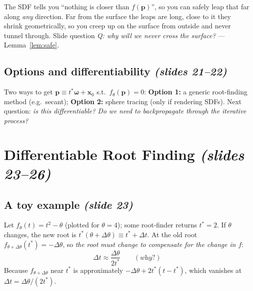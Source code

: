 \documentclass[11pt,a4paper]{article}
\newcommand{\bx}{{\bm{x}}}
\newcommand{\bp}{{\bm{p}}}
\newcommand{\bom}{{\bm{\omega}}}
\begin{document}
\begin{intuition}
The SDF tells you ``nothing is closer than $f(\bp)$'', so you can safely leap that far along \emph{any} direction. Far
from the surface the leaps are long, close to it they shrink geometrically, so you creep up on the surface from outside
and never tunnel through. Slide question \emph{Q: why will we never cross the surface?} --- Lemma~\ref{lem:safe}.
\end{intuition}

\subsection{Options and differentiability \emph{(slides 21--22)}}
Two ways to get $\bp\equiv t^*\bom+\bx_0$ s.t.\ $f_\theta(\bp)=0$: \textbf{Option 1:} a generic root-finding method
(e.g.\ secant); \textbf{Option 2:} sphere tracing (only if rendering SDFs). Next question: \emph{is this differentiable?}
\emph{Do we need to backpropagate through the iterative process?}

\section{Differentiable Root Finding \emph{(slides 23--26)}}
\subsection{A toy example \emph{(slide 23)}}
Let $f_\theta(t)=t^2-\theta$ (plotted for $\theta=4$); some root-finder returns $t^*=2$. If $\theta$ changes, the new
root is $t^*(\theta+\Delta\theta)\equiv t^*+\Delta t$. At the old root $f_{\theta+\Delta\theta}(t^*)=-\Delta\theta$, so
\emph{the root must change to compensate for the change in $f$}:
\[
\Delta t\approx\frac{\Delta\theta}{2t^*}\qquad(\textit{why?})
\]
Because $f_{\theta+\Delta\theta}$ near $t^*$ is approximately $-\Delta\theta+2t^*(t-t^*)$, which vanishes at $\Delta t=\Delta\theta/(2t^*)$.
\end{document}
